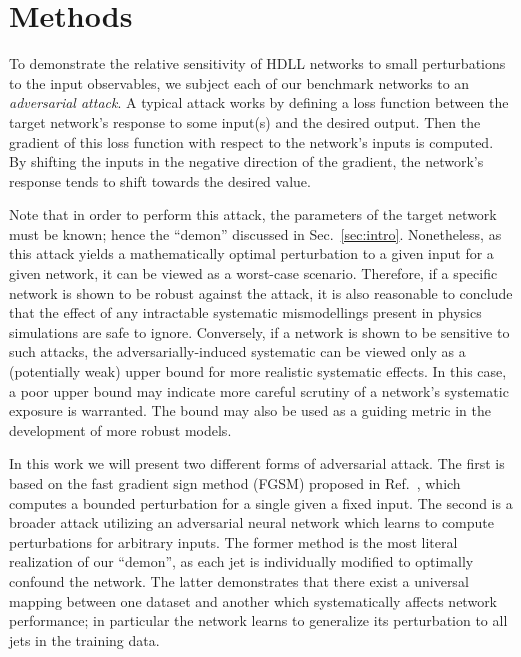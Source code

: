 \documentclass[reprint,nofootinbib,...]{revtex4-1}
\newcommand{\ntrain}{145k}       %
\newcommand{\nval}{26k}            %
\newcommand{\aucCLS}{0.88}    %
\begin{document}

\section{Methods}
To demonstrate the relative sensitivity of HDLL networks to small perturbations to the input observables, we subject each of our benchmark networks to an \textit{adversarial attack}.
A typical attack works by defining a loss function between the target network's response to some input(s) and the desired output.
Then the gradient of this loss function with respect to the network's inputs is computed.
By shifting the inputs in the negative direction of the gradient, the network's response tends to shift towards the desired value.

Note that in order to perform this attack, the parameters of the target network must be known; hence the ``demon'' discussed in Sec.~\ref{sec:intro}.
Nonetheless, as this attack yields a mathematically optimal perturbation to a given input for a given network, it can be viewed as a worst-case scenario.
Therefore, if a specific network is shown to be robust against the attack, it is also reasonable to conclude that the effect of any intractable systematic mismodellings present in physics simulations are safe to ignore.
Conversely, if a network is shown to be sensitive to such attacks, the adversarially-induced systematic can be viewed only as a (potentially weak) upper bound for more realistic systematic effects.
In this case, a poor upper bound may indicate more careful scrutiny of a network's systematic exposure is warranted.
The bound may also be used as a guiding metric in the development of more robust models.

In this work we will present two different forms of adversarial attack.
The first is based on the fast gradient sign method (FGSM) proposed in Ref.~\cite{DBLP:journals/corr/GoodfellowSS14}, which computes a bounded perturbation for a single given a fixed input.
The second is a broader attack utilizing an adversarial neural network which learns to compute perturbations for arbitrary inputs.
The former method is the most literal realization of our ``demon'', as each jet is individually modified to optimally confound the network.
The latter demonstrates that there exist a universal mapping between one dataset and another which systematically affects network performance; in particular the network learns to generalize its perturbation to all jets in the training data.
\end{document}
